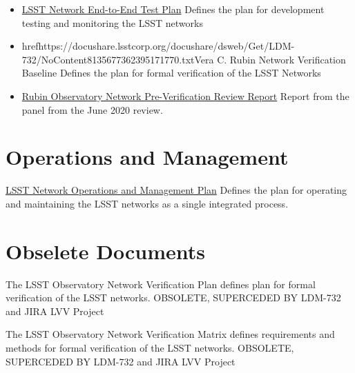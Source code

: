 \begin{itemize}
    \item \href{https://confluence.lsstcorp.org/download/attachments/20284335/LSST%20LHN%20End-to-End_Plan_v6.docx?version=1&modificationDate=1490879785000&api=v2}{LSST Network End-to-End Test Plan} Defines the plan for development 
    testing and monitoring the LSST networks
    \item href{https://docushare.lsstcorp.org/docushare/dsweb/Get/LDM-732/NoContent8135677362395171770.txt}{Vera C. Rubin Network Verification Baseline} Defines the plan for formal verification of the LSST Networks
    \item \href{https://docushare.lsstcorp.org/docushare/dsweb/Get/Document-35934/Rubin%20Observatory%20Networks%20Pre-Verification%20Review%20Report%202020-06-22.pdf}{Rubin Observatory Network Pre-Verification Review Report} Report from the panel from the June 2020 review.
\end{itemize}

\section{Operations and Management}

\href{https://confluence.lsstcorp.org/download/attachments/20284335/LSST%20Network%20O%26M%20Plan_v2.docx?version=1&modificationDate=1490879794000&api=v2}{LSST Network Operations and Management Plan}  Defines the plan for operating and maintaining the LSST networks as a single integrated process.

\section{Obselete Documents}

The LSST Observatory Network Verification Plan defines plan for formal verification of the LSST networks.  OBSOLETE, SUPERCEDED BY LDM-732 and JIRA LVV Project

The LSST Observatory Network Verification Matrix defines requirements and methods for formal verification of the LSST networks. OBSOLETE, SUPERCEDED BY LDM-732 and JIRA LVV Project

